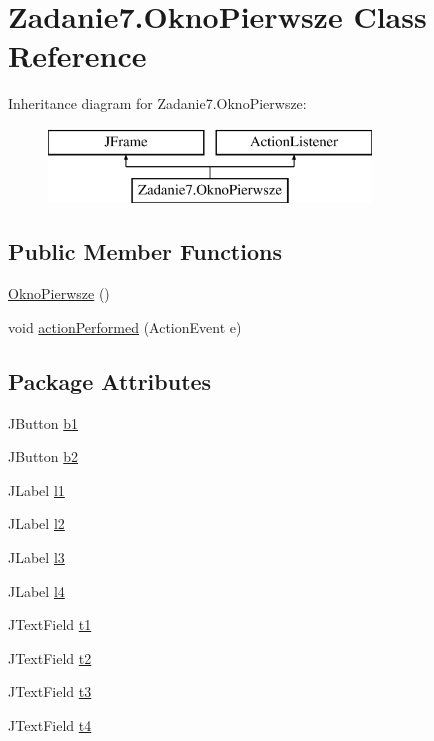 \hypertarget{class_zadanie7_1_1_okno_pierwsze}{}\section{Zadanie7.\+Okno\+Pierwsze Class Reference}
\label{class_zadanie7_1_1_okno_pierwsze}
Inheritance diagram for Zadanie7.\+Okno\+Pierwsze\+:\begin{figure}[H]
\begin{center}
\leavevmode
\includegraphics[height=2.000000cm]{class_zadanie7_1_1_okno_pierwsze}
\end{center}
\end{figure}
\subsection*{Public Member Functions}
\begin{DoxyCompactItemize}
\item 
\hyperlink{class_zadanie7_1_1_okno_pierwsze_aa4688831adc252f51059082333d5d487}{Okno\+Pierwsze} ()
\item 
void \hyperlink{class_zadanie7_1_1_okno_pierwsze_a2e3ea026f54071b2ed6c455a03913f60}{action\+Performed} (Action\+Event e)
\end{DoxyCompactItemize}
\subsection*{Package Attributes}
\begin{DoxyCompactItemize}
\item 
J\+Button \hyperlink{class_zadanie7_1_1_okno_pierwsze_aab4f419a650d2c8e5de90fc5eb75fc2b}{b1}
\item 
J\+Button \hyperlink{class_zadanie7_1_1_okno_pierwsze_a68b3a8081f2dedec7781e0908e4f8097}{b2}
\item 
J\+Label \hyperlink{class_zadanie7_1_1_okno_pierwsze_a63d3c938296a4de6303082d443a1a4e8}{l1}
\item 
J\+Label \hyperlink{class_zadanie7_1_1_okno_pierwsze_acb7e2e97fa47e9fbf8766edb58ea955b}{l2}
\item 
J\+Label \hyperlink{class_zadanie7_1_1_okno_pierwsze_ad23ac88cadae6e42871783c670d4ac02}{l3}
\item 
J\+Label \hyperlink{class_zadanie7_1_1_okno_pierwsze_adaa1ed1d82045750e6876c334a270a07}{l4}
\item 
J\+Text\+Field \hyperlink{class_zadanie7_1_1_okno_pierwsze_aa647d95695a358010c1c2d7801d2d3e0}{t1}
\item 
J\+Text\+Field \hyperlink{class_zadanie7_1_1_okno_pierwsze_a1a34a46dac7d3710c9abee8c74d52ef2}{t2}
\item 
J\+Text\+Field \hyperlink{class_zadanie7_1_1_okno_pierwsze_a7ab2f446b910b4a42d04e6d43dcbfc72}{t3}
\item 
J\+Text\+Field \hyperlink{class_zadanie7_1_1_okno_pierwsze_a23c1fb6015afadc86ce249d59d2d9543}{t4}
\end{DoxyCompactItemize}
